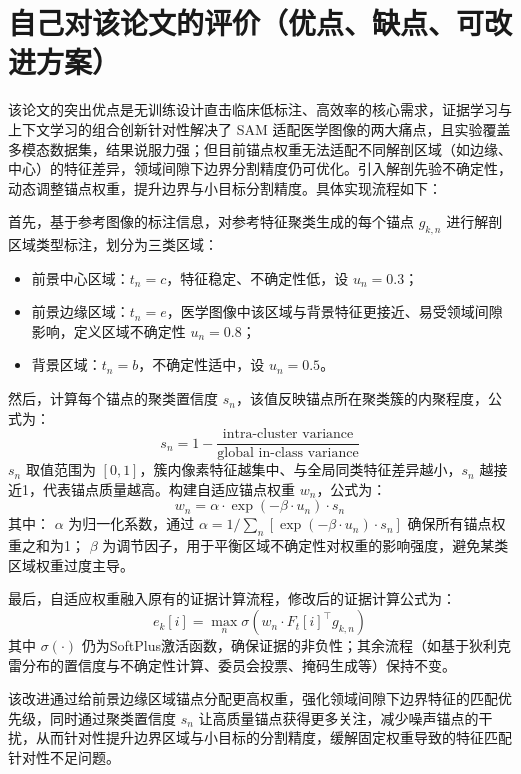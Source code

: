 \documentclass[12pt,a4paper]{article}
\begin{document}
	\section{自己对该论文的评价（优点、缺点、可改进方案）}
	该论文的突出优点是无训练设计直击临床低标注、高效率的核心需求，证据学习与上下文学习的组合创新针对性解决了 SAM 适配医学图像的两大痛点，且实验覆盖多模态数据集，结果说服力强；但目前锚点权重无法适配不同解剖区域（如边缘、中心）的特征差异，领域间隙下边界分割精度仍可优化。引入解剖先验不确定性，动态调整锚点权重，提升边界与小目标分割精度。具体实现流程如下：\par 	首先，基于参考图像的标注信息，对参考特征聚类生成的每个锚点 $g_{k,n}$ 进行解剖区域类型标注，划分为三类区域：
	\begin{itemize}
		\item 前景中心区域：$t_n = c$，特征稳定、不确定性低，设 $u_n = 0.3$；
		\item 前景边缘区域：$t_n = e$，医学图像中该区域与背景特征更接近、易受领域间隙影响，定义区域不确定性 $u_n = 0.8$；
		\item 背景区域：$t_n = b$，不确定性适中，设 $u_n = 0.5$。
	\end{itemize}
	然后，计算每个锚点的聚类置信度 $s_n$，该值反映锚点所在聚类簇的内聚程度，公式为：
	\[
	s_n = 1 - \frac{\text{intra-cluster variance}}{\text{global in-class variance}}
	\]
	$s_n$ 取值范围为 $[0,1]$，簇内像素特征越集中、与全局同类特征差异越小，$s_n$ 越接近1，代表锚点质量越高。构建自适应锚点权重 $w_n$，公式为：
	\[
	w_n = \alpha \cdot \exp(-\beta \cdot u_n) \cdot s_n
	\]
	其中：
	$\alpha$ 为归一化系数，通过 $\alpha = 1/\sum_n \left[\exp(-\beta \cdot u_n) \cdot s_n\right]$ 确保所有锚点权重之和为1；
	$\beta$ 为调节因子，用于平衡区域不确定性对权重的影响强度，避免某类区域权重过度主导。\par 
	最后，自适应权重融入原有的证据计算流程，修改后的证据计算公式为：
	\[
	e_k[i] = \max_n \sigma\left(w_n \cdot F_t[i]^\top g_{k,n}\right)
	\]
	其中 $\sigma(\cdot)$ 仍为SoftPlus激活函数，确保证据的非负性；其余流程（如基于狄利克雷分布的置信度与不确定性计算、委员会投票、掩码生成等）保持不变。
	
	该改进通过给前景边缘区域锚点分配更高权重，强化领域间隙下边界特征的匹配优先级，同时通过聚类置信度 $s_n$ 让高质量锚点获得更多关注，减少噪声锚点的干扰，从而针对性提升边界区域与小目标的分割精度，缓解固定权重导致的特征匹配针对性不足问题。
	
\end{document}
